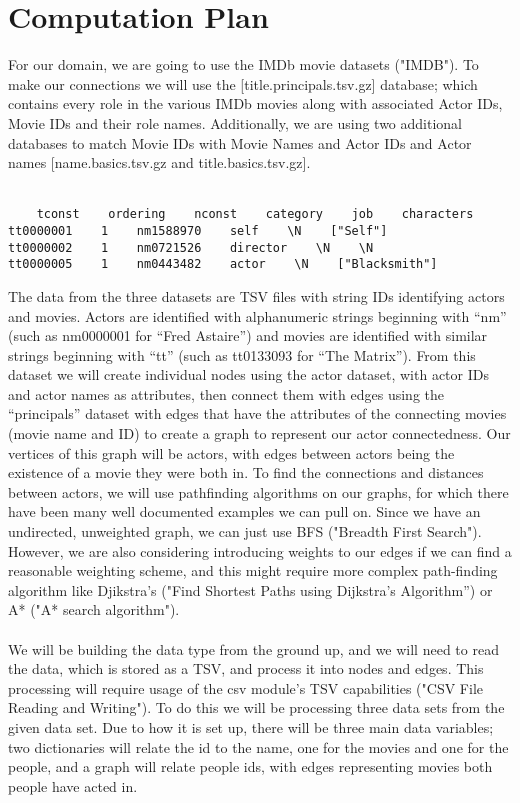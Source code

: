 \documentclass{article}
\begin{document}
\section{Computation Plan}
For our domain, we are going to use the IMDb movie datasets ("IMDB"). To make our connections we will use the [title.principals.tsv.gz] database; which contains every role in the various IMDb movies along with associated Actor IDs, Movie IDs and their role names. Additionally, we are using two additional databases to match Movie IDs with Movie Names and Actor IDs and Actor names [name.basics.tsv.gz and title.basics.tsv.gz].\\\\
\begin{verbatim}
    tconst    ordering    nconst    category    job    characters
tt0000001    1    nm1588970    self    \N    ["Self"]
tt0000002    1    nm0721526    director    \N    \N
tt0000005    1    nm0443482    actor    \N    ["Blacksmith"]
\end{verbatim}
The data from the three datasets are TSV files with string IDs identifying actors and movies. Actors are identified with alphanumeric strings beginning with “nm” (such as nm0000001 for “Fred Astaire”) and movies are identified with similar strings beginning with “tt” (such as tt0133093 for “The Matrix”). From this dataset we will create individual nodes using the actor dataset, with actor IDs and actor names as attributes, then connect them with edges using the “principals” dataset with edges that have the attributes of the connecting movies (movie name and ID) to create a graph to represent our actor connectedness. Our vertices of this graph will be actors, with edges between actors being the existence of a movie they were both in. To find the connections and distances between actors, we will use pathfinding algorithms on our graphs, for which there have been many well documented examples we can pull on. Since we have an undirected, unweighted graph, we can just use BFS ("Breadth First Search"). However, we are also considering introducing weights to our edges if we can find a reasonable weighting scheme, and this might require more complex path-finding algorithm like Djikstra’s ("Find Shortest Paths using Dijkstra's Algorithm”) or A* ("A* search algorithm"). \\\\
We will be building the data type from the ground up, and we will need to read the data, which is stored as a TSV, and process it into nodes and edges. This processing will require usage of the csv module’s TSV capabilities ("CSV File Reading and Writing"). To do this we will be processing three data sets from the given data set. Due to how it is set up, there will be three main data variables; two dictionaries will relate the id to the name, one for the movies and one for the people, and a graph will relate people ids, with edges representing movies both people have acted in.\\\\
\end{document}
